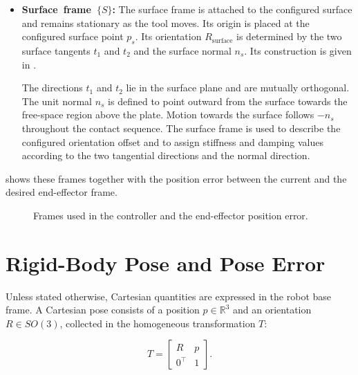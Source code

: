\begin{itemize}
  \item \mbox{\textbf{Surface frame \mbox{\(\{S\}\)}:}}
        The surface frame is attached to the configured surface and remains
        stationary as the tool moves. Its origin is placed at the configured surface
        point \mbox{\(p_s\)}. Its orientation \mbox{\(R_{\mathrm{surface}}\)} is
        determined by the two surface tangents \mbox{\(t_1\)} and \mbox{\(t_2\)} and
        the surface normal \mbox{\(n_s\)}. Its construction is given in
        \mbox{}.

        The directions \mbox{\(t_1\)} and \mbox{\(t_2\)} lie in the surface plane and are
        mutually orthogonal. The unit normal \mbox{\(n_s\)} is defined to point
        outward from the surface towards the free-space region above the plate.
        Motion towards the surface follows \mbox{\(-n_s\)} throughout the
        contact sequence. The surface frame is used to
        describe the configured orientation offset and to assign stiffness
        and damping values according to the two tangential directions and the
        normal direction.
\end{itemize}

\mbox{} shows these frames together with the position
error between the current and the desired end-effector frame.

\begin{figure}[H]
  \centering
  
  \caption{Frames used in the controller and the end-effector position error.}
  \label{fig:reference_frames}
\end{figure}

\section{Rigid-Body Pose and Pose Error}
\label{sec:rigid_transformations}

Unless stated otherwise, Cartesian quantities are expressed in the robot base
frame. A Cartesian pose consists of a position \mbox{\(p\in\mathbb{R}^3\)} and
an orientation \mbox{\(R\in SO(3)\)}, collected in the homogeneous
transformation \mbox{\(T\)}:

\begin{equation}
T=
\begin{bmatrix}
R & p\\
0^\top & 1
\end{bmatrix}.
\label{eq:homogeneous_transformation}
\end{equation}

